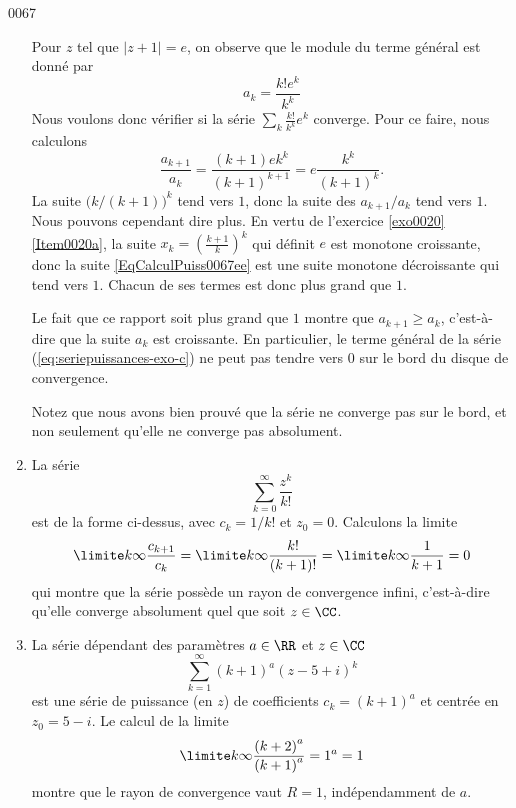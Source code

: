 \begin{corrige}{0067}
\begin{enumerate}
Pour $z$ tel que $| z+1 | = e$, on observe que le module du terme général est donné par
\begin{equation}
a_k = \frac{k! e^k}{k^k}
\end{equation}
Nous voulons donc vérifier si la série $\sum_k\frac{ k! }{ k^k }e^k$ converge. Pour ce faire, nous calculons
\begin{equation}\label{EqCalculPuiss0067ee}
	\frac{a_{k+1}}{a_k}=\frac{ (k+1)ek^k }{ (k+1)^{k+1} }=e\frac{ k^k }{ (k+1)^k }.
\end{equation}
La suite $\big( k/(k+1) \big)^k$ tend vers $1$, donc la suite des $a_{k+1}/a_k$ tend vers $1$. Nous pouvons cependant dire plus. En vertu de l'exercice \ref{exo0020}\ref{Item0020a}, la suite $x_k=\left( \frac{ k+1 }{ k } \right)^k$ qui définit $e$ est monotone croissante, donc la suite \eqref{EqCalculPuiss0067ee} est une suite monotone décroissante qui tend vers $1$. Chacun de ses termes est donc plus grand que $1$.


Le fait que ce rapport soit plus grand que $1$ montre que $a_{k+1} \geq a_k$, c'est-à-dire que la suite $a_k$ est croissante. En particulier, le terme général de la série (\ref{eq:seriepuissances-exo-c}) ne peut pas tendre vers $0$ sur le bord du disque de convergence.

Notez que nous avons bien prouvé que la série ne converge pas sur le bord, et non seulement qu'elle ne converge pas absolument.

\item 
La série
\begin{equation*}
	\sum_{k=0}^\infty \frac{z^k}{k!}
\end{equation*}
est de la forme ci-dessus, avec $c_k = 1/k!$ et $z_0 = 0$. Calculons la limite
\begin{equation*}
\limite k \infty \frac{c_{k+1}}{c_k} = \limite k\infty
\frac{k!}{(k+1)!} = \limite k\infty \frac{1}{k+1} = 0
\end{equation*}
qui montre que la série possède un rayon de convergence infini,
c'est-à-dire qu'elle converge absolument quel que soit $z \in \CC$.

\item La série dépendant des paramètres $a \in \RR$ et $z \in \CC$
\begin{equation*}
\sum_{k=1}^\infty {(k+1)}^a {(z- 5 + i)}^k
\end{equation*}
est une série de puissance (en $z$) de coefficients $c_k =
{(k+1)}^a$ et centrée en $z_0 = 5 - i$. Le calcul de la limite
\begin{equation*}
\limite k\infty \frac{{(k+2)}^a}{{(k+1)}^a} = 1^a = 1
\end{equation*}
montre que le rayon de convergence vaut $R = 1$, indépendamment de
$a$.


\end{enumerate}
\end{corrige}
